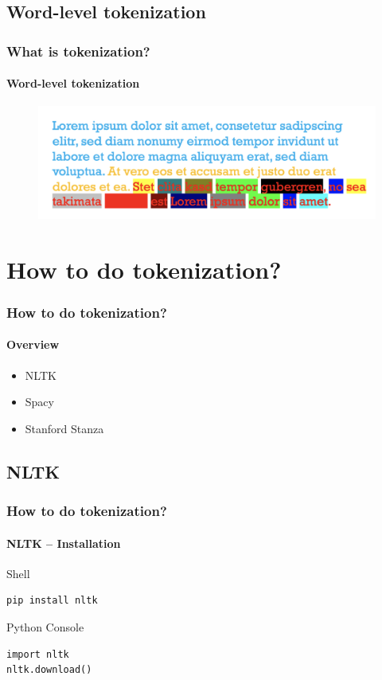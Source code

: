 \documentclass{beamer}
\begin{document}
\subsection{Word-level tokenization}
\begin{frame}
    \frametitle{What is tokenization?}
    \framesubtitle{Word-level tokenization}
    \begin{figure}
        \includegraphics[scale=0.3]{word}    
    \end{figure}
\end{frame}

\section{How to do tokenization?}
\begin{frame}
    \frametitle{How to do tokenization?}
    \framesubtitle{Overview}
    \begin{itemize}
        \item NLTK
        \item Spacy
        \item Stanford Stanza
    \end{itemize}
\end{frame}

\subsection{NLTK}
\begin{frame}[containsverbatim]
    \frametitle{How to do tokenization?}
    \framesubtitle{NLTK -- Installation}
    
    \begin{block}{Shell}
        \begin{lstlisting}
pip install nltk
        \end{lstlisting}
    \end{block}
    \begin{block}{Python Console}
        \begin{lstlisting}
import nltk
nltk.download()
        \end{lstlisting}
    \end{block}
    
\end{frame}
\end{document}
